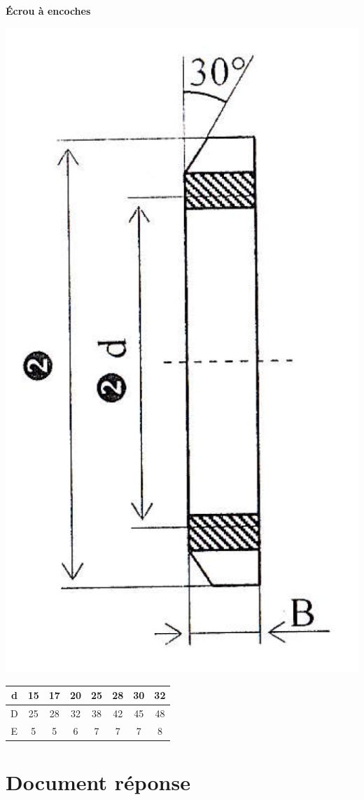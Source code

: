 \textbf{Écrou à encoches}

\begin{minipage}{0.3\linewidth}
 \includegraphics[width=0.6\linewidth]{img/dessin03}
\end{minipage}\hfill
\begin{minipage}{0.65\linewidth}
\begin{tabular}{|c|c|c|c|c|c|c|c|}
\hline
d & 15 & 17 & 20 & 25 & 28 & 30 & 32 \\
\hline
D & 25 & 28 & 32 & 38 & 42 & 45 & 48 \\
\hline
E & 5 & 5 & 6 & 7 & 7 & 7 & 8 \\
\hline
\end{tabular}
\end{minipage}

\cleardoublepage


\section{Document réponse}




